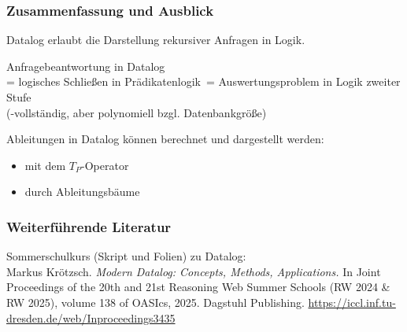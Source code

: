 \documentclass[aspectratio=1610,onlymath]{beamer}
\let\beameroriginaldoublebackslash\\
\let\\=\beameroriginaldoublebackslash
\begin{document}
\begin{frame}\frametitle{Zusammenfassung und Ausblick}

Datalog erlaubt die Darstellung rekursiver Anfragen in Logik.\bigskip

Anfragebeantwortung in Datalog\\
= logisches Schließen in Prädikatenlogik\
= Auswertungsproblem in Logik zweiter Stufe\\
(\ExpTime-vollständig, aber polynomiell bzgl. Datenbankgröße)\bigskip

Ableitungen in Datalog können berechnet und dargestellt werden:
\begin{itemize}
\item mit dem $T_P$-Operator
\item durch Ableitungsbäume
\end{itemize}\bigskip


\end{frame}


\begin{frame}[t]\frametitle{Weiterführende Literatur}

\alert{Sommerschulkurs (Skript und Folien) zu Datalog:}\\[1ex]
Markus Krötzsch. \emph{Modern Datalog: Concepts, Methods, Applications.}
In Joint Proceedings of the 20th and 21st Reasoning Web Summer Schools (RW 2024 \& RW 2025),
volume 138 of OASIcs, 2025. Dagstuhl Publishing. \url{https://iccl.inf.tu-dresden.de/web/Inproceedings3435}



\end{frame}

% 
% 
\end{document}
